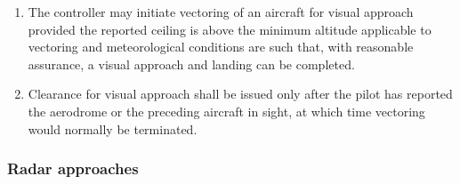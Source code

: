\begin{enumerate}
    \item The controller may initiate vectoring of an aircraft for visual approach provided the reported ceiling is above the minimum altitude applicable to vectoring and meteorological conditions are such that, with reasonable assurance, a visual approach and landing can be completed.
    \item Clearance for visual approach shall be issued only after the pilot has reported the aerodrome or the preceding aircraft in sight, at which time vectoring would normally be terminated.
\end{enumerate}

\subsubsection{Radar approaches}

